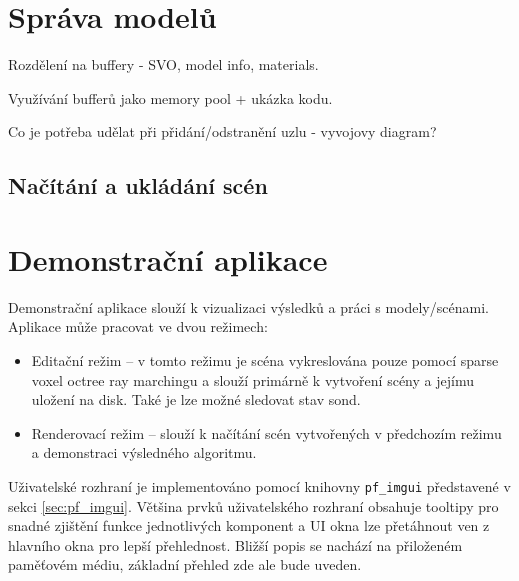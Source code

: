 \section{Správa modelů} \label{sec:model_management}
Rozdělení na buffery - SVO, model info, materials.

Využívání bufferů jako memory pool + ukázka kodu.

Co je potřeba udělat při přidání/odstranění uzlu - vyvojovy diagram?

\subsection{Načítání a ukládání scén}

\section{Demonstrační aplikace}
Demonstrační aplikace slouží k vizualizaci výsledků a práci s modely/scénami. Aplikace může pracovat ve dvou režimech:
\begin{itemize}
    \item Editační režim -- v tomto režimu je scéna vykreslována pouze pomocí sparse voxel octree ray marchingu a slouží primárně k vytvoření scény a jejímu uložení na disk. Také je lze možné sledovat stav sond.
    \item Renderovací režim -- slouží k načítání scén vytvořených v předchozím režimu a demonstraci výsledného algoritmu.
\end{itemize}

Uživatelské rozhraní je implementováno pomocí knihovny \texttt{pf\_imgui} představené v sekci \ref{sec:pf_imgui}. Většina prvků uživatelského rozhraní obsahuje tooltipy pro snadné zjištění funkce jednotlivých komponent a UI okna lze přetáhnout ven z hlavního okna pro lepší přehlednost. Bližší popis se nachází na přiloženém paměťovém médiu, základní přehled zde ale bude uveden.

